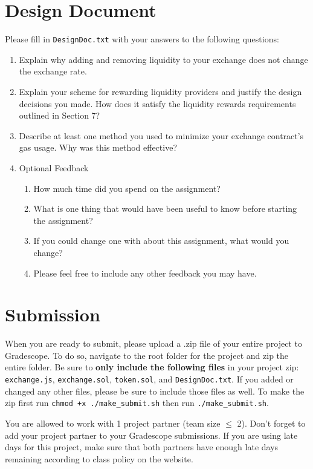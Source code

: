 \documentclass[11pt]{article}
\begin{document}
\section{Design Document}
Please fill in \texttt{DesignDoc.txt} with your answers to the following questions:
\begin{enumerate}
    \item Explain why adding and removing liquidity to your exchange does not change the exchange rate.
    \item Explain your scheme for rewarding liquidity providers and justify the design decisions you made. How does it satisfy the liquidity rewards requirements outlined in Section 7?
    \item Describe at least one method you used to minimize your exchange contract's gas usage. Why was this method effective?
    \item Optional Feedback
    \begin{enumerate}
        \item How much time did you spend on the assignment?
        \item  What is one thing that would have been useful to know before starting the assignment?
        \item If you could change one with about this assignment, what would you change?
        \item Please feel free to include any other feedback you may have.
    \end{enumerate}
\end{enumerate}

\section{Submission}
When you are ready to submit, please upload a .zip file of your entire project to Gradescope. To do so, navigate to the root folder for the project and zip the entire folder. Be sure to \textbf{only include the following files} in your project zip: \texttt{exchange.js}, \texttt{exchange.sol}, \texttt{token.sol}, and \texttt{DesignDoc.txt}. If you added or changed any other files, please be sure to include those files as well. To make the zip first run \texttt{chmod +x ./make\_submit.sh} then run \texttt{./make\_submit.sh}. 

You are allowed to work with 1 project partner (team size $\le$ 2). Don't forget to add your project partner to your Gradescope submissions. If you are using late days for this project, make sure that both partners have enough late days remaining according to class policy on the website.  
\end{document}
